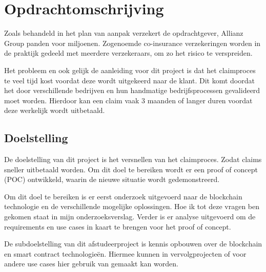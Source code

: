 \chapter{Opdrachtomschrijving}
Zoals behandeld in het plan van aanpak verzekert de opdrachtgever, Allianz Group panden voor miljoenen. Zogenoemde co-insurance verzekeringen worden in de praktijk gedeeld met meerdere verzekeraars, om zo het risico te verspreiden.\par

Het probleem en ook gelijk de aanleiding voor dit project is dat het claimproces te veel tijd kost voordat deze wordt uitgekeerd naar de klant. Dit komt doordat het door verschillende bedrijven en hun handmatige bedrijfsprocessen gevalideerd moet worden. Hierdoor kan een claim vaak 3 maanden of langer duren voordat deze werkelijk wordt uitbetaald.

\section{Doelstelling}
De doelstelling van dit project is het versnellen van het claimproces. Zodat claims sneller uitbetaald worden. Om dit doel te bereiken wordt er een proof of concept (POC) ontwikkeld, waarin de nieuwe situatie wordt gedemonstreerd.

Om dit doel te bereiken is er eerst onderzoek uitgevoerd naar de blockchain technologie en de verschillende mogelijke oplossingen. Hoe ik tot deze vragen ben gekomen staat in mijn onderzoeksverslag\cite{onderzoeksverslag}. Verder is er analyse uitgevoerd om de requirements en use cases in kaart te brengen voor het proof of concept.

De subdoelstelling van dit afstudeerproject is kennis opbouwen over de blockchain en smart contract technologieën. Hiermee kunnen in vervolgprojecten of voor andere use cases hier gebruik van gemaakt kan worden.
